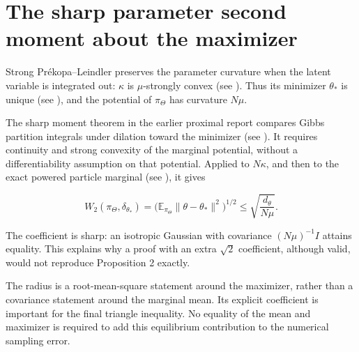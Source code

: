 \documentclass[11pt,a4paper]{article}
\begin{document}
\section{\texorpdfstring{The sharp parameter second moment about the maximizer}{The sharp parameter second moment about the maximizer}}


Strong Prékopa–Leindler preserves the parameter curvature when the latent
variable is integrated out: \(\kappa\) is \(\mu\)-strongly convex (see \cite[Section~3.12.3]{LangevinLean2026IPLA}). Thus its minimizer \(\theta_*\) is unique (see \cite[Section~3.12.4]{LangevinLean2026IPLA}), and the potential of \(\pi_\Theta\) has curvature \(N\mu\).




The sharp moment theorem in the earlier proximal report compares Gibbs partition integrals under dilation toward the minimizer (see \cite[Section~3.5.2]{LangevinLean2026Proximal}). It requires continuity and strong convexity of the marginal potential, without a differentiability assumption on that potential. Applied to \(N\kappa\), and then to the exact powered particle marginal (see \cite[Section~3.6.1]{LangevinLean2026Proximal}), it gives


\[W_2(\pi_\Theta,\delta_{\theta_*})
=\bigl(\mathbb E_{\pi_\Theta}\|\theta-\theta_*\|^2\bigr)^{1/2}
\le\sqrt{\frac{d_\theta}{N\mu}}.\]


The coefficient is sharp: an isotropic Gaussian with covariance
\((N\mu)^{-1}I\) attains equality. This explains why a proof with an extra
\(\sqrt2\) coefficient, although valid, would not reproduce Proposition 2
exactly.



The radius is a root-mean-square statement around the maximizer, rather than a covariance statement around the marginal mean. Its explicit coefficient is important for the final triangle inequality. No equality of the mean and maximizer is required to add this equilibrium contribution to the numerical sampling error.
\end{document}
